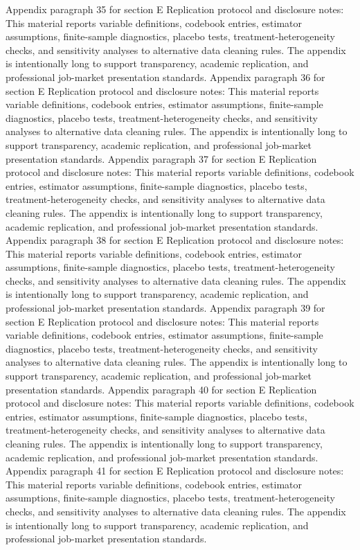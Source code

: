 \documentclass[preprint,12pt]{elsarticle}
\begin{document}
Appendix paragraph 35 for section E Replication protocol and disclosure notes: This material reports variable definitions, codebook entries, estimator assumptions, finite-sample diagnostics, placebo tests, treatment-heterogeneity checks, and sensitivity analyses to alternative data cleaning rules. The appendix is intentionally long to support transparency, academic replication, and professional job-market presentation standards.
Appendix paragraph 36 for section E Replication protocol and disclosure notes: This material reports variable definitions, codebook entries, estimator assumptions, finite-sample diagnostics, placebo tests, treatment-heterogeneity checks, and sensitivity analyses to alternative data cleaning rules. The appendix is intentionally long to support transparency, academic replication, and professional job-market presentation standards.
Appendix paragraph 37 for section E Replication protocol and disclosure notes: This material reports variable definitions, codebook entries, estimator assumptions, finite-sample diagnostics, placebo tests, treatment-heterogeneity checks, and sensitivity analyses to alternative data cleaning rules. The appendix is intentionally long to support transparency, academic replication, and professional job-market presentation standards.
Appendix paragraph 38 for section E Replication protocol and disclosure notes: This material reports variable definitions, codebook entries, estimator assumptions, finite-sample diagnostics, placebo tests, treatment-heterogeneity checks, and sensitivity analyses to alternative data cleaning rules. The appendix is intentionally long to support transparency, academic replication, and professional job-market presentation standards.
Appendix paragraph 39 for section E Replication protocol and disclosure notes: This material reports variable definitions, codebook entries, estimator assumptions, finite-sample diagnostics, placebo tests, treatment-heterogeneity checks, and sensitivity analyses to alternative data cleaning rules. The appendix is intentionally long to support transparency, academic replication, and professional job-market presentation standards.
Appendix paragraph 40 for section E Replication protocol and disclosure notes: This material reports variable definitions, codebook entries, estimator assumptions, finite-sample diagnostics, placebo tests, treatment-heterogeneity checks, and sensitivity analyses to alternative data cleaning rules. The appendix is intentionally long to support transparency, academic replication, and professional job-market presentation standards.
Appendix paragraph 41 for section E Replication protocol and disclosure notes: This material reports variable definitions, codebook entries, estimator assumptions, finite-sample diagnostics, placebo tests, treatment-heterogeneity checks, and sensitivity analyses to alternative data cleaning rules. The appendix is intentionally long to support transparency, academic replication, and professional job-market presentation standards.
\end{document}

